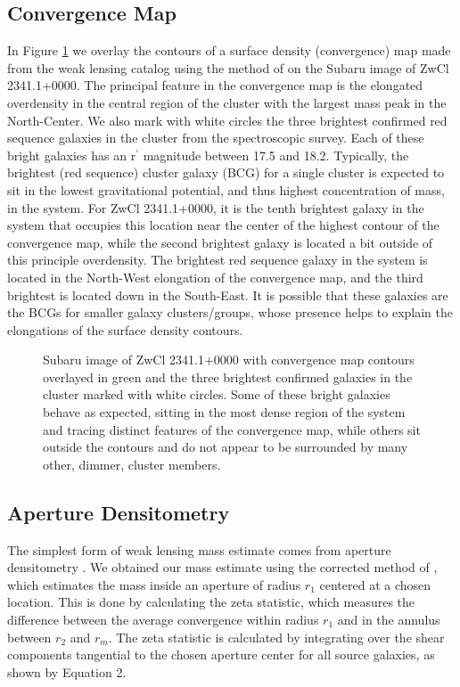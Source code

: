 \documentclass[onecolumn]{aastex}
\begin{document}
\subsection{Convergence Map}
In Figure \ref{fig11} we overlay the contours of a surface density (convergence) map made from the weak lensing catalog using the method of \cite{Fischer97} on the Subaru image of ZwCl 2341.1+0000.  The principal feature in the convergence map is the elongated overdensity in the central region of the cluster with the largest mass peak in the North-Center.  We also mark with white circles the three brightest confirmed red sequence galaxies in the cluster from the spectroscopic survey.  Each of these bright galaxies has an r$^\prime$ magnitude between 17.5 and 18.2.  Typically, the brightest (red sequence) cluster galaxy (BCG) for a single cluster is expected to sit in the lowest gravitational potential, and thus highest concentration of mass, in the system.  For ZwCl 2341.1+0000, it is the tenth brightest galaxy in the system that occupies this location near the center of the highest contour of the convergence map, while the second brightest galaxy is located a bit outside of this principle overdensity.  The brightest red sequence galaxy in the system is located in the North-West elongation of the convergence map, and the third brightest is located down in the South-East.  It is possible that these galaxies are the BCGs for smaller galaxy clusters/groups, whose presence helps to explain the elongations of the surface density contours.  

\begin{figure} 
\caption{Subaru image of ZwCl 2341.1+0000 with convergence map contours overlayed in green and the three brightest confirmed galaxies in the cluster marked with white circles.  Some of these bright galaxies behave as expected, sitting in the most dense region of the system and tracing distinct features of the convergence map, while others sit outside the contours and do not appear to be surrounded by many other, dimmer, cluster members.\label{fig11}} 
\end{figure}


\subsection{Aperture Densitometry}
The simplest form of weak lensing mass estimate comes from aperture densitometry \citep{Fahlman94}.  We obtained our mass estimate using the corrected method of \cite{Clowe98, Clowe00}, which estimates the mass inside an aperture of radius $r_1$ centered at a chosen location.  This is done by calculating the zeta statistic, which measures the difference between the average convergence within radius $r_1$ and in the annulus between $r_2$ and $r_m$.  The zeta statistic is calculated by integrating over the shear components tangential to the chosen aperture center for all source galaxies, as shown by Equation 2.  
\end{document}
